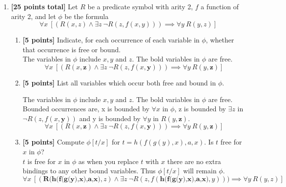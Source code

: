 \documentclass{article}
\begin{document}
\begin{enumerate}
\begin{enumerate}
  \end{enumerate}

\item \textbf{[25 points total]} Let $R$ be a predicate symbol with
  arity 2, $f$ a function of arity 2, and let $\phi$ be the formula
  \begin{displaymath}
        \forall x\
        [(R(x,z) \land  \exists z\ \neg R(z,f(x,y)))
        \implies \forall y\ R(y,z)]
  \end{displaymath}
  \begin{enumerate}

  \item \textbf{[5 points]} Indicate, for each occurrence of each
    variable in $\phi$, whether that occurrence is free or bound.\\
    The variables in $\phi$ include $x,y$ and $z$. The bold variables in $\phi$ are free. 
    \begin{displaymath}
        \forall x\
        [(R(x,\textbf{z}) \land  \exists z\ \neg R(z,f(x,\textbf{y})))
        \implies \forall y\ R(y,\textbf{z})]
  \end{displaymath}
    

  \item \textbf{[5 points]} List all variables which occur both free
    and bound in $\phi$.
    
    The variables in $\phi$ include $x,y$ and $z$. The bold variables in $\phi$ are free. Bounded occurrences are, x is bounded by $\forall x$ in $\phi$, z is bounded by $\exists z$ in $\neg R(z,f(x,\textbf{y}))$ and y is bounded by $ \forall y$ in $R(y,\textbf{z})$.
    \begin{displaymath}
        \forall x\
        [(R(x,\textbf{z}) \land  \exists z\ \neg R(z,f(x,\textbf{y})))
        \implies \forall y\ R(y,\textbf{z})]
  \end{displaymath}

  \item \textbf{[5 points]} Compute $\phi[t/x]$ for
    $t = h(f(g(y),x),a,x)$.  Is $t$ free for $x$ in $\phi$?\\
    $t$ is free for $x$ in $\phi$ as when you replace $t$ with $x$ there are no extra bindings to any other bound variables. Thus $\phi[t/x]$ will remain $\phi$.
    \begin{displaymath}
        \forall x\
        [(\textbf{R(h(f(g(y),x),a,x)},z) \land  \exists z\ \neg R(z,f(\textbf{h(f(g(y),x),a,x)},y)))
        \implies \forall y\ R(y,z)]
  \end{displaymath}


\end{enumerate}
\end{enumerate}
\end{document}
